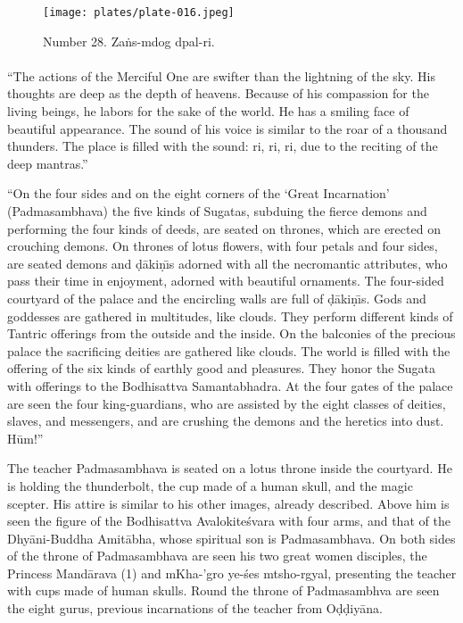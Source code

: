 \documentclass[a4paper, 12pt, oneside]{article}
\begin{document}
\clearpage
\begin{figure}[H]
\centering
\texttt{[image: plates/plate-016.jpeg]}
\caption*{Number 28. Za\.{n}s-mdog dpal-ri.}
\end{figure}
\clearpage
\paragraph{}
``The actions of the Merciful One are swifter than the lightning of the sky. His thoughts are deep as the depth of heavens. Because of his compassion for the living beings, he labors for the sake of the world. He has a smiling face of beautiful appearance. The sound of his voice is similar to the roar of a thousand thunders. The place is filled with the sound: ri, ri, ri, due to the reciting of the deep mantras.''

``On the four sides and on the eight corners of the `Great Incarnation' (Padmasambhava) the five kinds of Sugatas, subduing the fierce demons and performing the four kinds of deeds, are seated on thrones, which are erected on crouching demons. On thrones of lotus flowers, with four petals and four sides, are seated demons and \d{d}\={a}ki\d{n}\={\i}s adorned with all the necromantic attributes, who pass their time in enjoyment, adorned with beautiful ornaments. The four-sided courtyard of the palace and the encircling walls are full of \d{d}\={a}ki\d{n}\={\i}s. Gods and goddesses are gathered in multitudes, like clouds. They perform different kinds of Tantric offerings from the outside and the inside. On the balconies of the precious palace the sacrificing deities are gathered like clouds. The world is filled with the offering of the six kinds of earthly good and pleasures. They honor the Sugata with offerings to the Bodhisattva Samantabhadra. At the four gates of the palace are seen the four king-guardians, who are assisted by the eight classes of deities, slaves, and messengers, and are crushing the demons and the heretics into dust. H\={u}m!''

The teacher Padmasambhava is seated on a lotus throne inside the courtyard. He is holding the thunderbolt, the cup made of a human skull, and the magic scepter. His attire is similar to his other images, already described. Above him is seen the figure of the Bodhisattva Avalokite\'{s}vara with four arms, and that of the Dhy\={a}ni-Buddha Amit\={a}bha, whose spiritual son is Padmasambhava. On both sides of the throne of Padmasambhava are seen his two great women disciples, the Princess Mand\={a}rava (1) and mKha-'gro ye-\'{s}es mtsho-rgyal, presenting the teacher with cups made of human skulls. Round the throne of Padmasambhva are seen the eight gurus, previous incarnations of the teacher from O\d{d}\d{d}iy\={a}na.
\end{document}
